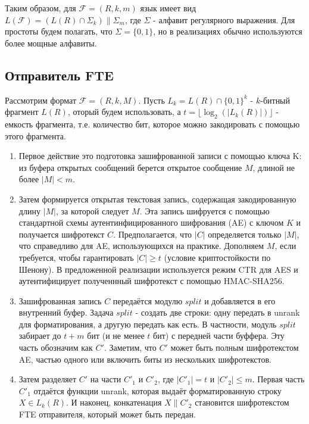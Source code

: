 Таким образом, для $\mathcal{F} = (R, k, m)$ язык имеет вид $L(\mathcal{F}) = (L(R) \cap \Sigma_k) \| \Sigma_m$, где $\Sigma$ - алфавит регулярного выражения.
Для простоты будем полагать, что $\Sigma = \{0, 1\}$, но в реализациях обычно используются более мощные алфавиты.

\subsection{Отправитель FTE}

Рассмотрим формат $\mathcal{F} = (R, k, M)$.
Пусть $L_k = L(R) \cap \{0, 1\}^k$ - $k$-битный фрагмент $L(R)$,
оторый будем использовать, а $t = \lfloor \log_2(|L_k(R)|) \rfloor$ - емкость фрагмента,
т.е. количество бит, которое можно закодировать с помощью этого фрагмента.

\begin{enumerate}
    \item Первое действие это подготовка зашифрованной записи с помощью ключа K:
          из буфера открытых сообщений берется открытое сообщение $M$, длиной не более $|M| < m$.
    \item Затем формируется открытая текстовая запись, содержащая закодированную длину $|M|$, за которой следует $M$.
          Эта запись шифруется с помощью стандартной схемы аутентинфицированного шифрования (AE) с ключом $K$ и получается шифротекст $C$.
          Предполагается, что $|C|$ определяется только $|M|$, что справедливо для AE, использующихся на практике.
          Дополняем $M$, если требуется, чтобы гарантировать $|C| \geq t$ (условие криптостойкости по Шенону).
          В предложенной реализации используется режим CTR для AES и аутентифицирует полученнный шифротекст с помощью HMAC-SHA256.
    \item Зашифрованная запись $C$ передаётся модулю $split$ и добавляется в его внутренний буфер.
          Задача $split$ - создать две строки: одну передать в unrank для форматирования, а другую передать как есть.
          В частности, модуль $split$ забирает до $t + m$ бит (и не менее $t$ бит) с передней части буффера. Эту часть обозначим как $C'$.
          Заметим, что $C'$ может быть полным шифротекстом AE, частью одного или включить биты из нескольких шифротекстов.
    \item Затем разделяет $C'$ на части $C'_1$ и $C'_2$, где $|C'_1| = t$ и $|C'_2| \leq m$.
          Первая часть $C'_1$ отдаётся функции unrank, которая выдаёт форматированную строку $X \in L_k(R)$.
          И наконец, конкатенация $X \| C'_2$ становится шифротекстом FTE отправителя, который может быть передан.
\end{enumerate}

